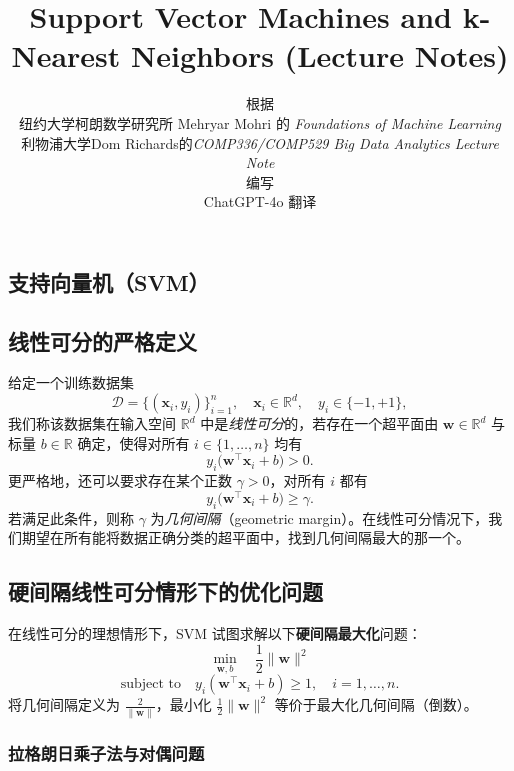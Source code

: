 \documentclass[11pt]{article}
\title{\textbf{Support Vector Machines and k-Nearest Neighbors (Lecture Notes)}}
\author{根据 \\ 纽约大学柯朗数学研究所 Mehryar Mohri 的 \textit{Foundations of Machine Learning} \\ 利物浦大学Dom Richards的\textit{COMP336/COMP529 Big Data Analytics Lecture Note} \\ 编写 \\ ChatGPT-4o 翻译}
\date{}
\begin{document}
\begin{CJK}{UTF8}{gbsn}  %

\maketitle

\section{支持向量机（SVM）}

\subsection{线性可分的严格定义}

给定一个训练数据集
\[
\mathcal{D} = \{(\mathbf{x}_i, y_i)\}_{i=1}^n, \quad \mathbf{x}_i \in \mathbb{R}^d, \quad y_i \in \{-1, +1\},
\]
我们称该数据集在输入空间 \(\mathbb{R}^d\) 中是\textit{线性可分}的，若存在一个超平面由 \(\mathbf{w} \in \mathbb{R}^d\) 与标量 \(b \in \mathbb{R}\) 确定，使得对所有 \(i \in \{1,\ldots,n\}\) 均有
\[
y_i\bigl(\mathbf{w}^\top \mathbf{x}_i + b\bigr) > 0.
\]
更严格地，还可以要求存在某个正数 \(\gamma>0\)，对所有 \(i\) 都有
\[
y_i\bigl(\mathbf{w}^\top \mathbf{x}_i + b\bigr) \ge \gamma.
\]
若满足此条件，则称 \(\gamma\) 为\textit{几何间隔}（geometric margin）。在线性可分情况下，我们期望在所有能将数据正确分类的超平面中，找到几何间隔最大的那一个。

\subsection{硬间隔线性可分情形下的优化问题}

在线性可分的理想情形下，SVM 试图求解以下\textbf{硬间隔最大化}问题：
\[
\min_{\mathbf{w}, b} \quad \frac{1}{2}\|\mathbf{w}\|^2
\]
\[
\text{subject\ to}\quad y_i(\mathbf{w}^\top \mathbf{x}_i + b) \geq 1, \quad i=1,\ldots,n.
\]
将几何间隔定义为 \(\frac{2}{\|\mathbf{w}\|}\)，最小化 \(\frac{1}{2}\|\mathbf{w}\|^2\) 等价于最大化几何间隔（倒数）。 

\subsubsection{拉格朗日乘子法与对偶问题}


\end{CJK}
\end{document}
